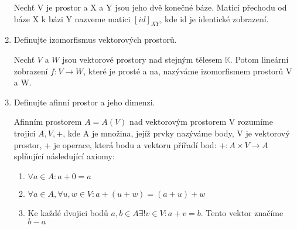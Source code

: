 \documentclass[10pt,a4paper]{article}
\begin{document}
\begin{enumerate}
Nechť V je prostor a X a Y jsou jeho dvě konečné báze. Maticí přechodu od báze X k bázi Y nazveme matici $[id]_{XY}$, kde id je identické zobrazení.
 

\item Definujte izomorfismus vektorových prostorů.

Nechť $V$ a $W$ jsou vektorové prostory nad stejným tělesem $\mathbb{K}$. Potom lineární zobrazení $f: V \to W$, které je prosté a na, nazýváme izomorfismem prostorů V a W.
 
\item Definujte afinní prostor a jeho dimenzi.

Afinním prostorem $A = A(V)$ nad vektorovým prostorem V rozumíme trojici ${A, V, +}$, kde A je množina, jejíž prvky nazýváme body, V je vektorový prostor, + je operace, která bodu a vektoru přířadí bod: $+: A \times V \to A$ splňující následující axiomy:
\begin{enumerate}
\item $\forall a \in A: a + 0 = a$
\item $\forall a \in A, \forall u,w \in V: a + (u + w) = (a + u) + w$
\item Ke každé dvojici bodů $a, b \in A \exists! v \in V: a+v = b$. Tento vektor značíme $b - a$
\end{enumerate}

\end{enumerate}

\newpage
\end{document}
